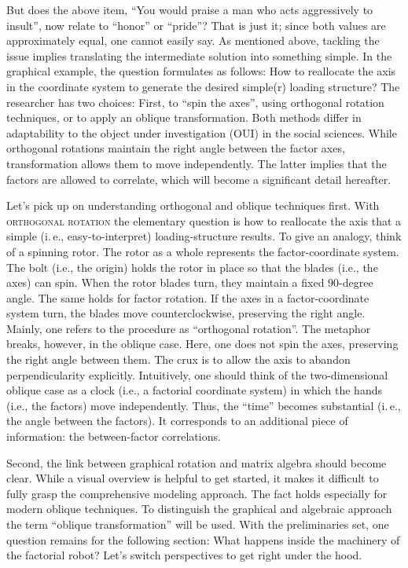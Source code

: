 \documentclass[jou, 11pt]{apa7}
\begin{document}
But does the above item, \enquote{You would praise a man who acts aggressively
to insult}, now relate to \enquote{honor} or \enquote{pride}? That is just it;
since both values are approximately equal, one cannot easily say. As mentioned
above, tackling the issue implies translating the intermediate solution into
something simple. In the graphical example, the question formulates as follows:
How to reallocate the axis in the coordinate system to generate the desired
simple(r) loading structure? The researcher has two choices: First, to
\enquote{spin the axes}, using orthogonal rotation techniques, or to apply an
oblique transformation. Both methods differ in adaptability to the object under
investigation (OUI) in the social sciences. While orthogonal rotations maintain
the right angle between the factor axes, transformation allows them to move
independently. The latter implies that the factors are allowed to correlate,
which will become a significant detail hereafter.

Let's pick up on understanding orthogonal and oblique techniques first. With
\textsc{orthogonal rotation} the elementary question is how to reallocate the
axis that a simple (i.\,e., easy-to-interpret) loading-structure results. To
give an analogy, think of a spinning rotor. The rotor as a whole represents the
factor-coordinate system. The bolt (i.e., the origin) holds the rotor in place
so that the blades (i.e., the axes) can spin. When the rotor blades turn, they
maintain a fixed 90-degree angle. The same holds for factor rotation. If the
axes in a factor-coordinate system turn, the blades move counterclockwise,
preserving the right angle. Mainly, one refers to the procedure as
\enquote{orthogonal rotation}. The metaphor breaks, however, in the oblique
case. Here, one does not spin the axes, preserving the right angle between
them. The crux is to allow the axis to abandon perpendicularity explicitly.
Intuitively, one should think of the two-dimensional oblique case as a clock
(i.e., a factorial coordinate system) in which the hands (i.e., the factors)
move independently. Thus, the “time” becomes substantial (i.\,e., the angle
between the factors). It corresponds to an additional piece of information: the
between-factor correlations.

Second, the link between graphical rotation and matrix algebra should become
clear. While a visual overview is helpful to get started, it makes it difficult
to fully grasp the comprehensive modeling approach. The fact holds especially
for modern oblique techniques. To distinguish the graphical and algebraic
approach the term \enquote{oblique transformation} \parencite{Revelle2021} will
be used. With the preliminaries set, one question remains for the following
section: What happens inside the machinery of the factorial robot? Let’s switch
perspectives to get right under the hood.
\end{document}
